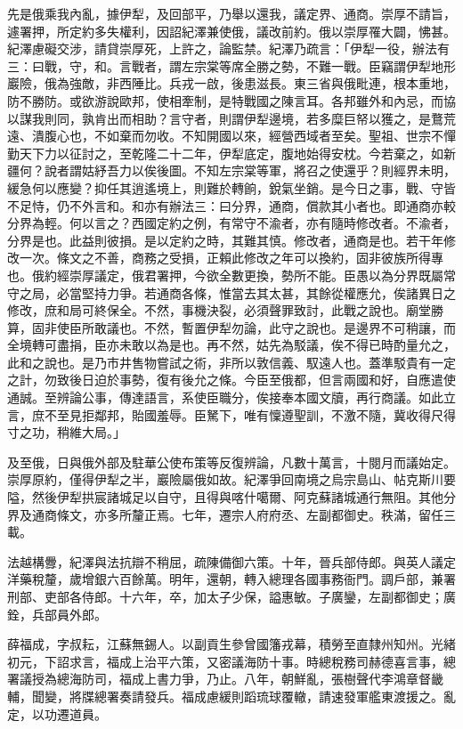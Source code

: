 \begin{pinyinscope}
先是俄乘我內亂，據伊犁，及回部平，乃舉以還我，議定界、通商。崇厚不請旨，遽署押，所定約多失權利，因詔紀澤兼使俄，議改前約。俄以崇厚罹大闢，怫甚。紀澤慮礙交涉，請貸崇厚死，上許之，論監禁。紀澤乃疏言：「伊犁一役，辦法有三：曰戰，守，和。言戰者，謂左宗棠等席全勝之勢，不難一戰。臣竊謂伊犁地形巖險，俄為強敵，非西陲比。兵戎一啟，後患滋長。東三省與俄毗連，根本重地，防不勝防。或欲游說歐邦，使相牽制，是特戰國之陳言耳。各邦雖外和內忌，而協以謀我則同，孰肯出而相助？言守者，則謂伊犁邊境，若多糜巨帑以獲之，是鶩荒遠、潰腹心也，不如棄而勿收。不知開國以來，經營西域者至矣。聖祖、世宗不憚勤天下力以征討之，至乾隆二十二年，伊犁底定，腹地始得安枕。今若棄之，如新疆何？說者謂姑紓吾力以俟後圖。不知左宗棠等軍，將召之使還乎？則經界未明，緩急何以應變？抑任其逍遙境上，則難於轉餉，銳氣坐銷。是今日之事，戰、守皆不足恃，仍不外言和。和亦有辦法三：曰分界，通商，償款其小者也。即通商亦較分界為輕。何以言之？西國定約之例，有常守不渝者，亦有隨時修改者。不渝者，分界是也。此益則彼損。是以定約之時，其難其慎。修改者，通商是也。若干年修改一次。條文之不善，商務之受損，正賴此修改之年可以換約，固非彼族所得專也。俄約經崇厚議定，俄君署押，今欲全數更換，勢所不能。臣愚以為分界既屬常守之局，必當堅持力爭。若通商各條，惟當去其太甚，其餘從權應允，俟諸異日之修改，庶和局可終保全。不然，事機決裂，必須聲罪致討，此戰之說也。廟堂勝算，固非使臣所敢議也。不然，暫置伊犁勿論，此守之說也。是邊界不可稍讓，而全境轉可盡捐，臣亦未敢以為是也。再不然，姑先為駁議，俟不得已時酌量允之，此和之說也。是乃市井售物嘗試之術，非所以敦信義、馭遠人也。蓋準駁貴有一定之計，勿致後日迫於事勢，復有後允之條。今臣至俄都，但言兩國和好，自應遣使通誠。至辨論公事，傳達語言，系使臣職分，俟接奉本國文牘，再行商議。如此立言，庶不至見拒鄰邦，貽國羞辱。臣駑下，唯有懍遵聖訓，不激不隨，冀收得尺得寸之功，稍維大局。」

及至俄，日與俄外部及駐華公使布策等反復辨論，凡數十萬言，十閱月而議始定。崇厚原約，僅得伊犁之半，巖險屬俄如故。紀澤爭回南境之烏宗島山、帖克斯川要隘，然後伊犁拱宸諸城足以自守，且得與喀什噶爾、阿克蘇諸城通行無阻。其他分界及通商條文，亦多所釐正焉。七年，遷宗人府府丞、左副都御史。秩滿，留任三載。

法越構釁，紀澤與法抗辯不稍屈，疏陳備御六策。十年，晉兵部侍郎。與英人議定洋藥稅釐，歲增銀六百餘萬。明年，還朝，轉入總理各國事務衙門。調戶部，兼署刑部、吏部各侍郎。十六年，卒，加太子少保，謚惠敏。子廣鑾，左副都御史；廣銓，兵部員外郎。

薛福成，字叔耘，江蘇無錫人。以副貢生參曾國籓戎幕，積勞至直隸州知州。光緒初元，下詔求言，福成上治平六策，又密議海防十事。時總稅務司赫德喜言事，總署議授為總海防司，福成上書力爭，乃止。八年，朝鮮亂，張樹聲代李鴻章督畿輔，聞變，將牒總署奏請發兵。福成慮緩則蹈琉球覆轍，請速發軍艦東渡援之。亂定，以功遷道員。


\end{pinyinscope}
